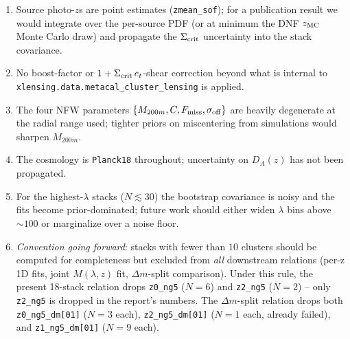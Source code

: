 \documentclass[11pt,a4paper]{article}
\newcommand{\dm}{\Delta m}
\newcommand{\Mtwoh}{M_{200m}}
\begin{document}
\begin{enumerate}
\item Source photo-$z$s are point estimates (\verb|zmean_sof|); for a publication
result we would integrate over the per-source PDF (or at minimum the DNF
$z_{\rm MC}$ Monte Carlo draw) and propagate the $\Sigma_{\rm crit}$
uncertainty into the stack covariance.
\item No boost-factor or $1+\Sigma_{\rm crit}\,e_t$-shear correction beyond
what is internal to \texttt{xlensing.data.metacal\_cluster\_lensing} is
applied.
\item The four NFW parameters $\{\Mtwoh, C, F_{\rm miss}, \sigma_{\rm off}\}$
are heavily degenerate at the radial range used; tighter priors on
miscentering from simulations would sharpen $\Mtwoh$.
\item The cosmology is \verb|Planck18| throughout; uncertainty on
$D_A(z)$ has not been propagated.
\item For the highest-$\lambda$ stacks ($N\lesssim 30$) the bootstrap
covariance is noisy and the fits become prior-dominated; future work should
either widen $\lambda$ bins above $\sim 100$ or marginalize over a noise
floor.
\item \emph{Convention going forward}: stacks with fewer than $10$ clusters
should be computed for completeness but excluded from \emph{all} downstream
relations (per-z 1D fits, joint $M(\lambda, z)$ fit, $\dm$-split
comparison). Under this rule, the present 18-stack relation drops
\texttt{z0\_ng5} ($N=6$) and \texttt{z2\_ng5} ($N=2$) -- only
\texttt{z2\_ng5} is dropped in the report's numbers. The
$\dm$-split relation drops both \texttt{z0\_ng5\_dm[01]} ($N=3$ each),
\texttt{z2\_ng5\_dm[01]} ($N=1$ each, already failed), and
\texttt{z1\_ng5\_dm[01]} ($N=9$ each).
\end{enumerate}
\end{document}
